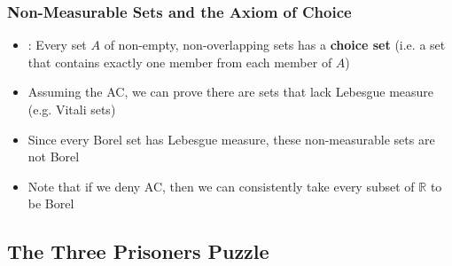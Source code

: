 \begin{frame}
\begin{itemize}[<+->]

\end{itemize}
\end{frame}

\begin{frame}
\frametitle{Non-Measurable Sets and the Axiom of Choice}

\begin{itemize}[<+->]

\item {}: Every set $A$ of non-empty, non-overlapping sets has a \textbf{choice set} (i.e. a set that contains exactly one member from each member of $A$)


\item Assuming the AC, we can prove there are sets that lack Lebesgue measure (e.g. Vitali sets)

\item Since every Borel set has Lebesgue measure, these non-measurable sets are not Borel

\item Note that if we deny AC, then we can consistently take every subset of $\mathbb{R}$ to be Borel 


\end{itemize}
\end{frame}

\subsection{The Three Prisoners Puzzle}

